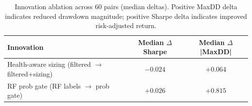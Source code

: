 \begin{table}[t]
\centering
\caption{Innovation ablation across 60 pairs (median deltas). Positive MaxDD delta indicates reduced drawdown magnitude; positive Sharpe delta indicates improved risk-adjusted return.}
\label{tab:innovation_ablation}
\small
\begin{tabular}{lcc}
\hline
\textbf{Innovation} & \textbf{Median $\Delta$ Sharpe} & \textbf{Median $\Delta$ |MaxDD|} \\
\hline
Health-aware sizing (filtered $\rightarrow$ filtered+sizing) & $-0.024$ & $+0.064$ \\
RF prob gate (RF labels $\rightarrow$ prob gate) & $+0.026$ & $+0.815$ \\
\hline
\end{tabular}
\end{table}
